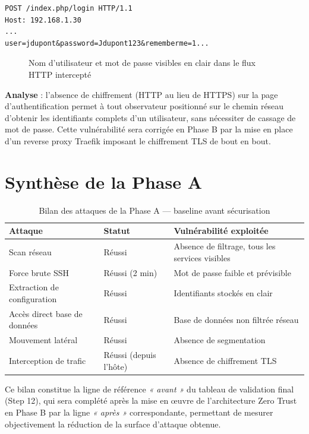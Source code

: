 \begin{lstlisting}[caption={Identifiants en clair interceptés dans le flux HTTP}]
POST /index.php/login HTTP/1.1
Host: 192.168.1.30
...
user=jdupont&password=Jdupont123&rememberme=1...
\end{lstlisting}

\begin{figure}[h]
\centering
\caption{Nom d'utilisateur et mot de passe visibles en clair dans le flux HTTP intercepté}
\label{fig:wireshark-stream}
\end{figure}

\textbf{Analyse} : l'absence de chiffrement (HTTP au lieu de HTTPS) sur
la page d'authentification permet à tout observateur positionné sur le
chemin réseau d'obtenir les identifiants complets d'un utilisateur, sans
nécessiter de cassage de mot de passe. Cette vulnérabilité sera corrigée
en Phase B par la mise en place d'un reverse proxy Traefik imposant le
chiffrement TLS de bout en bout.

\section{Synthèse de la Phase A}

\begin{table}[h]
\centering
\begin{tabular}{|l|l|l|}
\hline
\textbf{Attaque} & \textbf{Statut} & \textbf{Vulnérabilité exploitée} \\
\hline
Scan réseau & Réussi & Absence de filtrage, tous les services visibles \\
Force brute SSH & Réussi (2 min) & Mot de passe faible et prévisible \\
Extraction de configuration & Réussi & Identifiants stockés en clair \\
Accès direct base de données & Réussi & Base de données non filtrée réseau \\
Mouvement latéral & Réussi & Absence de segmentation \\
Interception de trafic & Réussi (depuis l'hôte) & Absence de chiffrement TLS \\
\hline
\end{tabular}
\caption{Bilan des attaques de la Phase A --- baseline avant sécurisation}
\label{tab:bilan-phase-a}
\end{table}

Ce bilan constitue la ligne de référence \textit{« avant »} du tableau
de validation final (Step 12), qui sera complété après la mise en œuvre
de l'architecture Zero Trust en Phase B par la ligne \textit{« après »}
correspondante, permettant de mesurer objectivement la réduction de la
surface d'attaque obtenue.
